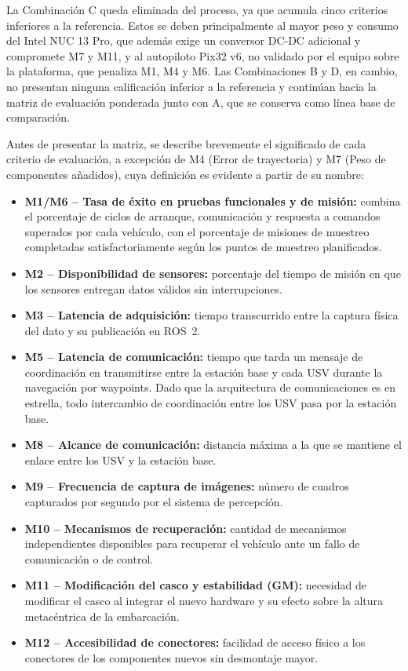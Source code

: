La Combinación C queda eliminada del proceso, ya que acumula cinco criterios inferiores a la 
referencia. Estos se deben principalmente al mayor peso y consumo del Intel NUC 13 Pro, que 
además exige un conversor DC-DC adicional y compromete M7 y M11, y al autopiloto Pix32 v6, 
no validado por el equipo sobre la plataforma, que penaliza M1, M4 y M6. Las Combinaciones B y D, 
en cambio, no presentan ninguna calificación inferior a la referencia y continúan hacia la matriz 
de evaluación ponderada junto con A, que se conserva como línea base de comparación.

\newpage

Antes de presentar la matriz, se describe brevemente el significado de cada criterio de
evaluación, a excepción de M4 (Error de trayectoria) y M7 (Peso de componentes añadidos),
cuya definición es evidente a partir de su nombre:

\begin{itemize}
  \item \textbf{M1/M6 -- Tasa de éxito en pruebas funcionales y de misión:} combina el
  porcentaje de ciclos de arranque, comunicación y respuesta a comandos superados por cada vehículo, 
  con el porcentaje de misiones de muestreo completadas
  satisfactoriamente según los puntos de muestreo planificados.
  \item \textbf{M2 -- Disponibilidad de sensores:} porcentaje del tiempo de misión en que
  los sensores entregan datos válidos sin interrupciones.
  \item \textbf{M3 -- Latencia de adquisición:} tiempo transcurrido entre la captura física
  del dato y su publicación en ROS~2.
  \item \textbf{M5 -- Latencia de comunicación:} tiempo que tarda un mensaje de coordinación en 
  transmitirse entre la estación base y cada USV durante la navegación por waypoints. Dado que la 
  arquitectura de comunicaciones es en estrella, todo intercambio de coordinación entre los USV 
  pasa por la estación base.
  \item \textbf{M8 -- Alcance de comunicación:} distancia máxima a la que se mantiene el
  enlace entre los USV y la estación base.
  \item \textbf{M9 -- Frecuencia de captura de imágenes:} número de cuadros capturados por
  segundo por el sistema de percepción.
  \item \textbf{M10 -- Mecanismos de recuperación:} cantidad de mecanismos independientes disponibles 
  para recuperar el vehículo ante un fallo de comunicación o de control.
  \item \textbf{M11 -- Modificación del casco y estabilidad (GM):} necesidad de modificar
  el casco al integrar el nuevo hardware y su efecto sobre la altura metacéntrica de la
  embarcación.
  \item \textbf{M12 -- Accesibilidad de conectores:} facilidad de acceso físico a los
  conectores de los componentes nuevos sin desmontaje mayor.
\end{itemize}

